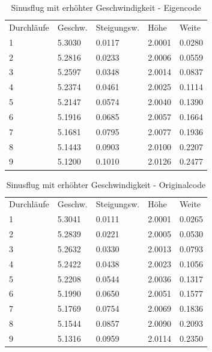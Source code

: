 \documentclass[a4paper,12pt]{scrartcl}
\begin{document}
\begin{table}
\centering
\caption{Sinusflug mit erhöhter Geschwindigkeit - Eigencode}
\begin{tabular}{lllll}
Durchläufe & Geschw. & Steigungsw. & Höhe   & Weite    \\
1          & 5.3030  & 0.0117      & 2.0001 & 0.0280   \\
2          & 5.2816  & 0.0233      & 2.0006 & 0.0559   \\
3          & 5.2597  & 0.0348      & 2.0014 & 0.0837  \\
4          & 5.2374  & 0.0461      & 2.0025 & 0.1114   \\
5          & 5.2147  & 0.0574      & 2.0040 & 0.1390   \\
6          & 5.1916  & 0.0685      & 2.0057 & 0.1664   \\
7          & 5.1681  & 0.0795      & 2.0077 & 0.1936   \\
8          & 5.1443  & 0.0903      & 2.0100 & 0.2207   \\
9          & 5.1200  & 0.1010      & 2.0126 & 0.2477  
\end{tabular}
\end{table}
\begin{table}
\centering
\caption{Sinusflug mit erhöhter Geschwindigkeit - Originalcode}
\begin{tabular}{lllll}
Durchläufe & Geschw. & Steigungsw. & Höhe    & Weite    \\
1          & 5.3041 & 0.0111     & 2.0001 & 0.0265  \\
2          & 5.2839 & 0.0221     & 2.0005 & 0.0530  \\
3          & 5.2632 & 0.0330     & 2.0013 & 0.0793  \\
4          & 5.2422 & 0.0438     & 2.0023 & 0.1056  \\
5          & 5.2208 & 0.0544     & 2.0036 & 0.1317  \\
6          & 5.1990 & 0.0650     & 2.0051 & 0.1577  \\
7          & 5.1769 & 0.0754     & 2.0069 & 0.1836  \\
8          & 5.1544 & 0.0857     & 2.0090 & 0.2093  \\
9          & 5.1316 & 0.0959     & 2.0114 & 0.2350 
\end{tabular}
\end{table}
\end{document}
